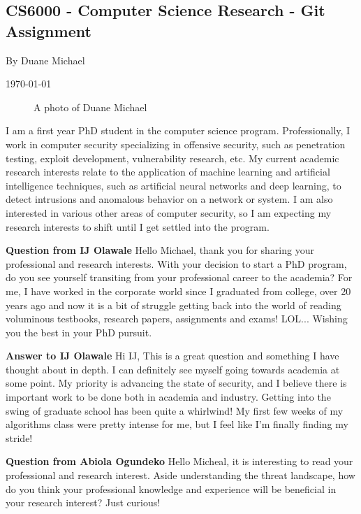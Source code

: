 \documentclass[11pt]{article}
\begin{document}
 
\begin{center}
    
    \section*{CS6000 - Computer Science Research - Git Assignment}
    By Duane Michael
    
    \today
\end{center}   
 

\begin{figure}[h]
    \centering
    \caption{A photo of Duane Michael}
    \label{fig:headshot}
\end{figure}
I am a first year PhD student in the computer science program. Professionally, I work in computer security specializing in offensive security, such as penetration testing, exploit development, vulnerability research, etc. My current academic research interests relate to the application of machine learning and artificial intelligence techniques, such as artificial neural networks and deep learning, to detect intrusions and anomalous behavior on a network or system. I am also interested in various other areas of computer security, so I am expecting my research interests to shift until I get settled into the program.

\textbf{Question from IJ Olawale}
Hello Michael, thank you for sharing your professional and research interests. With your decision to start a PhD program, do you see yourself transiting from your professional career to the academia? For me, I have worked in the corporate world since I graduated from college, over 20 years ago and now it is a bit of struggle getting back into the world of reading voluminous testbooks, research papers, assignments and exams! LOL... Wishing you the best in your PhD pursuit.

\textbf{Answer to IJ Olawale}
Hi IJ, This is a great question and something I have thought about in depth. I can definitely see myself going towards academia at some point. My priority is advancing the state of security, and I believe there is important work to be done both in academia and industry. Getting into the swing of graduate school has been quite a whirlwind! My first few weeks of my algorithms class were pretty intense for me, but I feel like I'm finally finding my stride!

\textbf{Question from Abiola Ogundeko}
Hello Micheal, it is interesting to read your professional and research interest. Aside understanding the threat landscape, how do you think your professional knowledge and experience will be beneficial in your research interest? Just curious!
\end{document}
